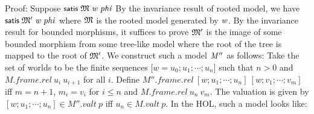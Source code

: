 \documentclass[letterpaper]{article}
\renewcommand{\HOLConst}[1]{{\textsf{\upshape\small #1}}}
\renewcommand{\HOLinline}[1]{\ensuremath{#1}}
\begin{document}
Proof:
  Suppose \HOLinline{\HOLConst{satis}\;\HOLFreeVar{\ensuremath{\mathfrak{M}}}\;\HOLFreeVar{w}\;\HOLFreeVar{phi}} By the invariance result of rooted model, we have \HOLinline{\HOLConst{satis}\;\HOLFreeVar{\ensuremath{\mathfrak{M}'}}\;\HOLFreeVar{w}\;\HOLFreeVar{phi}} where \HOLinline{\HOLFreeVar{\ensuremath{\mathfrak{M}}}} is the rooted model generated by \HOLinline{\HOLFreeVar{w}}. By the invariance result for bounded morphisms, it suffices to prove \HOLinline{\HOLFreeVar{\ensuremath{\mathfrak{M}'}}} is the image of some bounded morphism from some tree-like model where the root of the tree is mapped to the root of \HOLinline{\HOLFreeVar{\ensuremath{\mathfrak{M}'}}}. We construct such a model \HOLinline{\HOLFreeVar{M\sp{\prime\prime}}} as follows: Take the set of worlds to be the finite sequences [$w=u_0;u_1;\cdots ;u_n$] such that $n>0$ and $M.frame.rel \ u_i\ u_{i+1}$ for all $i$. Define $M''.frame.rel \ [w;u_1;\cdots ;u_n]\ [w;v_1;\cdots ;v_m]$ iff $m=n+1$, $m_i=v_i$ for $i\le n$ and $M.frame.rel \ u_n\ v_m$. The valuation is given by $[w;u_1;\cdots;u_n]\in M''.valt \ p$ iff $u_n\in M.valt \ p$. In the HOL, such a model looks like:
\end{document}
